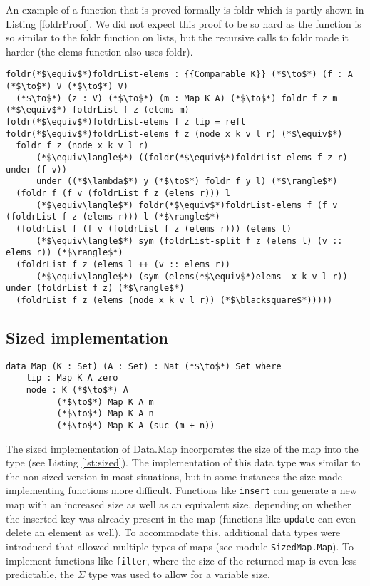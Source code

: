 \documentclass[a4paper,UKenglish,cleveref, autoref, thm-restate]{template/lipics-v2021}
\begin{document}
An example of a function that is proved formally is foldr which is partly shown in Listing \ref{foldrProof}. We did not expect this proof to be so hard as the function is so similar to the foldr function on lists, but the recursive calls to foldr made it harder (the elems function also uses foldr).

\begin{lstlisting}[label=foldrProof,caption=The following equality is proved foldr f z $\equiv$ foldr f z . elems]    
foldr(*$\equiv$*)foldrList-elems : {{Comparable K}} (*$\to$*) (f : A (*$\to$*) V (*$\to$*) V) 
  (*$\to$*) (z : V) (*$\to$*) (m : Map K A) (*$\to$*) foldr f z m (*$\equiv$*) foldrList f z (elems m)
foldr(*$\equiv$*)foldrList-elems f z tip = refl
foldr(*$\equiv$*)foldrList-elems f z (node x k v l r) (*$\equiv$*) 
  foldr f z (node x k v l r) 
      (*$\equiv\langle$*) ((foldr(*$\equiv$*)foldrList-elems f z r) under (f v)) 
      under ((*$\lambda$*) y (*$\to$*) foldr f y l) (*$\rangle$*)
  (foldr f (f v (foldrList f z (elems r))) l 
      (*$\equiv\langle$*) foldr(*$\equiv$*)foldrList-elems f (f v (foldrList f z (elems r))) l (*$\rangle$*)
  (foldrList f (f v (foldrList f z (elems r))) (elems l) 
      (*$\equiv\langle$*) sym (foldrList-split f z (elems l) (v :: elems r)) (*$\rangle$*)
  (foldrList f z (elems l ++ (v :: elems r)) 
      (*$\equiv\langle$*) (sym (elems(*$\equiv$*)elems  x k v l r)) under (foldrList f z) (*$\rangle$*)
  (foldrList f z (elems (node x k v l r)) (*$\blacksquare$*))))) 
\end{lstlisting}

\subsection{Sized implementation}

\begin{lstlisting}[label=lst:sized,caption=Sized map. The size of a tip is zero. The size of a node is one plus the sum of the sizes of its children.]
  data Map (K : Set) (A : Set) : Nat (*$\to$*) Set where
    tip : Map K A zero
    node : K (*$\to$*) A
          (*$\to$*) Map K A m
          (*$\to$*) Map K A n
          (*$\to$*) Map K A (suc (m + n))
\end{lstlisting}
The sized implementation of Data.Map incorporates the size of the map into the type (see Listing \ref{lst:sized}). The implementation of this data type was similar to the non-sized version in most situations, but in some instances the size made implementing functions more difficult. Functions like \texttt{insert} can generate a new map with an increased size as well as an equivalent size, depending on whether the inserted key was already present in the map (functions like \texttt{update} can even delete an element as well). To accommodate this, additional data types were introduced that allowed multiple types of maps (see module \texttt{SizedMap.Map}). To implement functions like \texttt{filter}, where the size of the returned map is even less predictable, the $\Sigma$ type was used to allow for a variable size.
\end{document}
